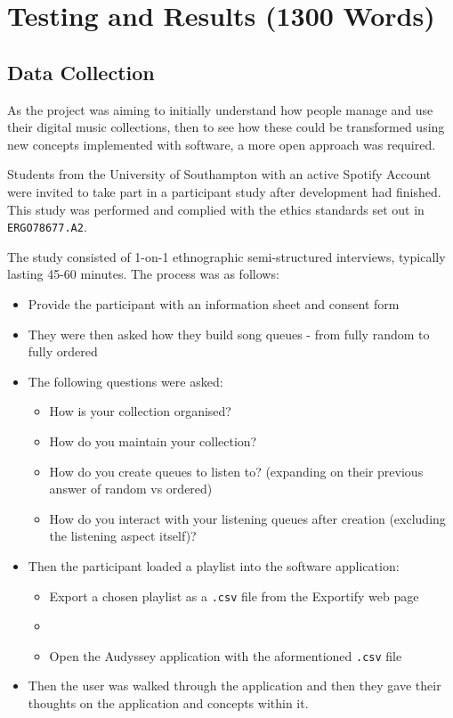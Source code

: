 \chapter{Testing and Results (1300 Words)}
\section{Data Collection}
As the project was aiming to initially understand how people manage and use their digital music collections, then to see how these could be transformed using new concepts implemented with software, a more open approach was required.

Students from the University of Southampton with an active Spotify Account were invited to take part in a participant study after development had finished. This study was performed and complied with the ethics standards set out in \texttt{ERGO78677.A2}.

The study consisted of 1-on-1 ethnographic semi-structured interviews, typically lasting 45-60 minutes. The process was as follows:\begin{itemize}
    \item Provide the participant with an information sheet and consent form
    \item They were then asked how they build song queues - from fully random to fully ordered
    \item The following questions were asked:\begin{itemize}
        \item How is your collection organised?
        \item How do you maintain your collection?
        \item How do you create queues to listen to? (expanding on their previous answer of random vs ordered)
        \item How do you interact with your listening queues after creation (excluding the listening aspect itself)?
    \end{itemize}
    \item Then the participant loaded a playlist into the software application:\begin{itemize}
        \item Export a chosen playlist as a \texttt{.csv} file from the Exportify web page
        \item \item Open the Audyssey application with the aformentioned \texttt{.csv} file
    \end{itemize}
    \item Then the user was walked through the application and then they gave their thoughts on the application and concepts within it.
\end{itemize}

